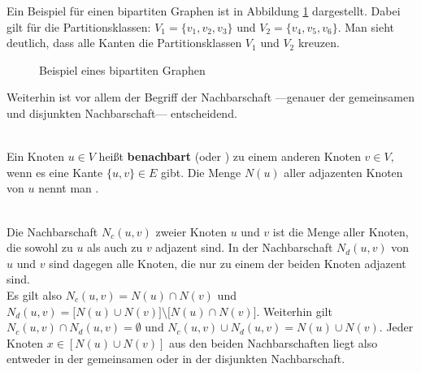 Ein Beispiel für einen bipartiten Graphen ist in Abbildung \ref{fig:beispiel_bipartit} dargestellt. 
Dabei gilt für die Partitionsklassen:
$V_1 = \{v_1,v_2,v_3\}$ und $V_2 = \{v_{4},v_5,v_6\}$. Man sieht deutlich, 
dass alle Kanten die Partitionsklassen
$V_1$ und $V_2$ \glqq kreuzen\grqq.
%
%
%
\begin{figure}
\centering
{}
\caption{Beispiel eines bipartiten Graphen}
\label{fig:beispiel_bipartit}
\end{figure}
%
%
%
Weiterhin ist vor allem der Begriff der Nachbarschaft ---genauer der gemeinsamen und disjunkten 
Nachbarschaft--- entscheidend.
\begin{definition}[Nachbarschaft]~\\
Ein Knoten $u \in V$ heißt \textbf{benachbart} (oder ) zu einem 
anderen Knoten $v \in V,$ wenn es eine Kante $\{u,v\} \in E $ gibt. Die Menge $N(u)$ aller adjazenten Knoten
von $u$ nennt man .
\end{definition}
\begin{definition}~\\
Die  Nachbarschaft $N_{c}(u,v)$ zweier Knoten $u$ und $v$ ist die Menge aller Knoten, die sowohl
zu $u$ als auch zu $v$ adjazent sind. In der  Nachbarschaft $N_{d}(u,v)$ von $u$ und $v$ sind dagegen 
alle Knoten, die nur zu einem der beiden Knoten adjazent sind. \\
Es gilt also $N_{c}(u,v) = N(u) \cap N(v)$ und $N_{d}(u,v) = \big[N(u) \cup N(v)\big]\setminus \big[N(u) \cap N(v) \big]$.{}
Weiterhin gilt $N_{c}(u,v) \cap N_{d}(u,v) = \emptyset$ und $N_{c}(u,v) \cup N_{d}(u,v) = N(u) \cup N(v)$.
Jeder Knoten $x\in \left[N(u) \cup N(v)\right]$ aus den beiden Nachbarschaften liegt also entweder
in der gemeinsamen oder in der disjunkten Nachbarschaft.
\label{def:common_disjoint}
\end{definition}

